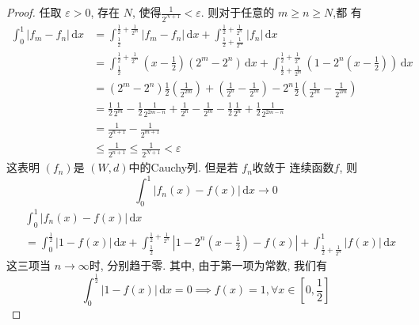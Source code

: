 \documentclass[../main.tex]{subfiles}
\begin{document}
\begin{proof}
    任取 \(   \varepsilon > 0  \), 存在 \(  N  \), 使得\(  \frac{1 }{2^{N+ 1} }<  \varepsilon    \).  则对于任意的 \(  m\ge n  \ge N\),都 有  \[
  \begin{aligned}
  \int_{0}^{1}\left| f_{m}-f_{n} \right|\,\mathrm{d} x&=   \int_{\frac{1}{2}}^{\frac{1}{2}+ \frac{1 }{2^{m} } }  \left| f_{m}-f_{n} \right|\,\mathrm{d} x + \int_{\frac{1}{2}+ \frac{1 }{2^{m} } }^{\frac{1}{2}+ \frac{1 }{2^{n} } }\left| f_{n} \right|\,\mathrm{d} x\\ 
   &= \int_{\frac{1}{2}}^{\frac{1}{2}+ \frac{1 }{2^{m} } } \left( x-\frac{1 }{2 }  \right)\left( 2^{m}-2^{n} \right)  \,\mathrm{d} x+  \int_{\frac{1}{2}+ \frac{1 }{2^{m} } }^{\frac{1}{2}+ \frac{1 }{2^{n} } }\left( 1-2^{n}\left( x-\frac{1 }{2 }  \right)  \right)\,\mathrm{d} x\\ 
    &= \left( 2^{m}-2^{n} \right)\frac{1}{2}\left( \frac{1 }{2^{2m} }  \right)+ \left( \frac{1 }{2^{n} }-\frac{1 }{2^{m} }   \right)- 2^{n} \frac{1 }{2 }\left( \frac{1 }{2^{2n} }-\frac{1 }{2^{2m} }   \right)      \\ 
     &= \frac{1}{2}\frac{1 }{2^{m} } -\frac{1}{2}\frac{1 }{2^{2m-n} } + \frac{1 }{2^{n} }-\frac{1 }{2^{m} } -\frac{1}{2}\frac{1 }{2^{n} }+ \frac{1}{2}\frac{1 }{2^{2m-n} }  \\ 
      &= \frac{1 }{2^{n+ 1} }-\frac{1 }{2^{m+ 1} }\\ 
       &\le \frac{1 }{2^{n+ 1} }\le \frac{1 }{2^{N+ 1} }<  \varepsilon     
  \end{aligned}
    \] 这表明 \(  \left( f_{n} \right)   \)是  \(  \left( W,d \right)   \)中的Cauchy列.  但是若 \(  f_{n}  \)收敛于 连续函数\(  f  \), 则 \[
    \int_{0}^{1}\left| f_{n}\left( x \right)-f\left( x \right)   \right|\,\mathrm{d} x\to 0 
    \]    \[
    \begin{aligned}
    &\int_{0}^{1}\left| f_{n}\left( x \right)-f\left( x \right)   \right|\,\mathrm{d} x  \\ 
     &=  \int_{0}^{\frac{1}{2}}\left| 1-f\left( x \right)  \right|\,\mathrm{d} x+  \int_{\frac{1}{2}}^{\frac{1}{2}+ \frac{1 }{2^{n} } }\left| 1-2^{n}\left( x-\frac{1 }{2 }  \right)-f\left( x \right)   \right|  +\int_{\frac{1 }{2 }+  \frac{1}{2^{n}}}^{1}\left| f\left( x \right)  \right|\,\mathrm{d} x 
    \end{aligned}
    \] 这三项当 \(  n\to \infty  \)时, 分别趋于零.  其中, 由于第一项为常数, 我们有 \[
    \int_{0}^{\frac{1}{2}}\left| 1-f\left( x \right)  \right|\,\mathrm{d} x= 0\implies  f\left( x \right)= 1,\forall x\in \left[ 0,\frac{1 }{2 }  \right]   
\]
\end{proof}
\end{document}
